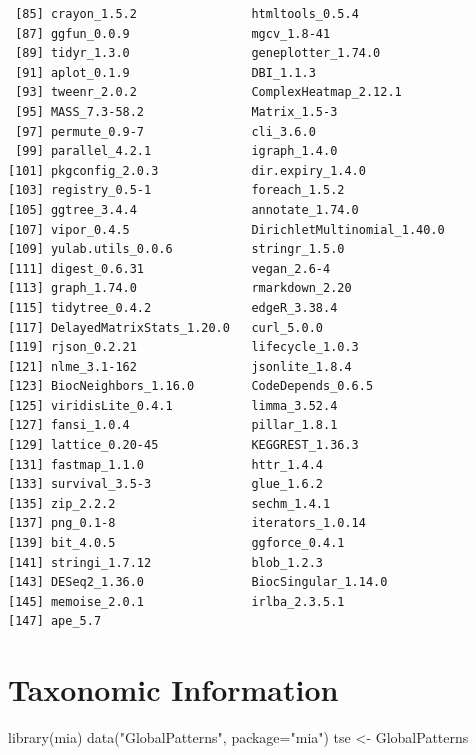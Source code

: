\documentclass[
]{book}
\newenvironment{Shaded}{\begin{snugshade}}{\end{snugshade}}
\newcommand{\AttributeTok}[1]{\textcolor[rgb]{0.77,0.63,0.00}{#1}}
\newcommand{\FunctionTok}[1]{\textcolor[rgb]{0.00,0.00,0.00}{#1}}
\newcommand{\NormalTok}[1]{#1}
\newcommand{\OtherTok}[1]{\textcolor[rgb]{0.56,0.35,0.01}{#1}}
\newcommand{\StringTok}[1]{\textcolor[rgb]{0.31,0.60,0.02}{#1}}
\begin{document}
\begin{verbatim}
 [85] crayon_1.5.2                htmltools_0.5.4            
 [87] ggfun_0.0.9                 mgcv_1.8-41                
 [89] tidyr_1.3.0                 geneplotter_1.74.0         
 [91] aplot_0.1.9                 DBI_1.1.3                  
 [93] tweenr_2.0.2                ComplexHeatmap_2.12.1      
 [95] MASS_7.3-58.2               Matrix_1.5-3               
 [97] permute_0.9-7               cli_3.6.0                  
 [99] parallel_4.2.1              igraph_1.4.0               
[101] pkgconfig_2.0.3             dir.expiry_1.4.0           
[103] registry_0.5-1              foreach_1.5.2              
[105] ggtree_3.4.4                annotate_1.74.0            
[107] vipor_0.4.5                 DirichletMultinomial_1.40.0
[109] yulab.utils_0.0.6           stringr_1.5.0              
[111] digest_0.6.31               vegan_2.6-4                
[113] graph_1.74.0                rmarkdown_2.20             
[115] tidytree_0.4.2              edgeR_3.38.4               
[117] DelayedMatrixStats_1.20.0   curl_5.0.0                 
[119] rjson_0.2.21                lifecycle_1.0.3            
[121] nlme_3.1-162                jsonlite_1.8.4             
[123] BiocNeighbors_1.16.0        CodeDepends_0.6.5          
[125] viridisLite_0.4.1           limma_3.52.4               
[127] fansi_1.0.4                 pillar_1.8.1               
[129] lattice_0.20-45             KEGGREST_1.36.3            
[131] fastmap_1.1.0               httr_1.4.4                 
[133] survival_3.5-3              glue_1.6.2                 
[135] zip_2.2.2                   sechm_1.4.1                
[137] png_0.1-8                   iterators_1.0.14           
[139] bit_4.0.5                   ggforce_0.4.1              
[141] stringi_1.7.12              blob_1.2.3                 
[143] DESeq2_1.36.0               BiocSingular_1.14.0        
[145] memoise_2.0.1               irlba_2.3.5.1              
[147] ape_5.7                    
\end{verbatim}

\hypertarget{taxonomic-information}{%
\chapter{Taxonomic Information}\label{taxonomic-information}}

\begin{Shaded}
\begin{Highlighting}[]
\FunctionTok{library}\NormalTok{(mia)}
\FunctionTok{data}\NormalTok{(}\StringTok{"GlobalPatterns"}\NormalTok{, }\AttributeTok{package=}\StringTok{"mia"}\NormalTok{)}
\NormalTok{tse }\OtherTok{\textless{}{-}}\NormalTok{ GlobalPatterns }
\end{Highlighting}
\end{Shaded}
\end{document}
